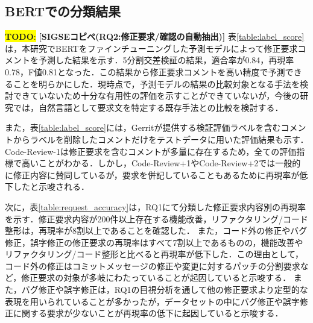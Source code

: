 \documentclass[11pt]{jreport}
\newcommand{\todo}[1]{\colorbox{yellow}{{\bf TODO}:}{\color{red} {\textbf{[#1]}}}}
\begin{document}
\subsection{BERTでの分類結果}

\todo{SIGSEコピペ(RQ2:修正要求/確認の自動抽出)}
表\ref{table:label_score}は，本研究でBERTをファインチューニングした予測モデルによって修正要求コメントを予測した結果を示す．5分割交差検証の結果，適合率が0.84，再現率0.78，F値0.81となった．この結果から修正要求コメントを高い精度で予測できることを明らかにした．現時点で，予測モデルの結果の比較対象となる手法を検討できていないため十分な有用性の評価を示すことができていないが，今後の研究では，自然言語として要求文を特定する既存手法との比較を検討する．

また，表\ref{table:label_score}には，Gerritが提供する検証評価ラベルを含むコメントからラベルを削除したコメントだけをテストデータに用いた評価結果も示す．Code-Review-1は修正要求を含むコメントが多量に存在するため，全ての評価指標で高いことがわかる．しかし，Code-Review+1やCode-Review+2では一般的に修正内容に賛同しているが，要求を併記していることもあるために再現率が低下したと示唆される．

\begin{table}[t]
\centering
  \caption{修正要求コメントの予測精度}
  \label{table:label_score}
\end{table}

次に，表\ref{table:request_accuracy}は，RQ1にて分類した修正要求内容別の再現率を示す．修正要求内容が200件以上存在する機能改善，リファクタリング/コード整形は，再現率が8割以上であることを確認した．
また，コード外の修正やバグ修正，誤字修正の修正要求の再現率はすべて7割以上であるものの，機能改善やリファクタリング/コード整形と比べると再現率が低下した．この理由として，コード外の修正はコミットメッセージの修正や変更に対するパッチの分割要求など，修正要求の対象が多岐にわたっていることが起因していると示唆する．
また，バグ修正や誤字修正は，RQ1の目視分析を通して他の修正要求より定型的な表現を用いられていることが多かったが，データセットの中にバグ修正や誤字修正に関する要求が少ないことが再現率の低下に起因していると示唆する．
\end{document}
